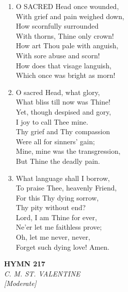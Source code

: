 \documentclass[11pt,a4paper]{article}
\begin{document}
\begin{enumerate}
    \item O SACRED Head once wounded, \\
            With grief and pain weighed down, \\
        How scornfully surrounded \\
            With thorns, Thine only crown! \\
        How art Thou pale with anguish, \\
            With sore abuse and scorn! \\
        How does that visage languish, \\
            Which once was bright as morn!

    \item O sacred Head, what glory, \\
            What bliss till now was Thine! \\
        Yet, though despised and gory, \\
            I joy to call Thee mine. \\
        Thy grief and Thy compassion \\
            Were all for sinners' gain; \\
        Mine, mine was the transgression, \\
            But Thine the deadly pain.

    \item What language shall I borrow, \\
            To praise Thee, heavenly Friend, \\
        For this Thy dying sorrow, \\
            Thy pity without end? \\
        Lord, I am Thine for ever, \\
            Ne'er let me faithless prove; \\
        Oh, let me never, never, \\
            Forget such dying love! Amen.

\end{enumerate}

\newpage
\begin{center}
    {\Large \textbf{HYMN 217}}
    \\
    \textit{C. M. ST. VALENTINE}
    \\
    \textit{\small [Moderate]}
\end{center}
\vspace{1em}
\end{document}
